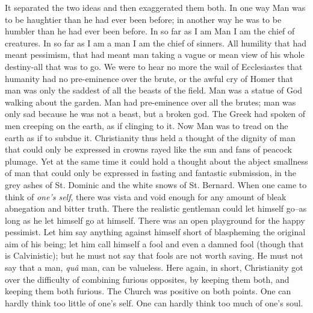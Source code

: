 \documentclass{book}
\begin{document}
It separated the two ideas and then exaggerated them both. In one way Man was to be haughtier than he had ever been before; in another way he was to be humbler than he had ever been before. In so far as I am Man I am the chief of creatures. In so far as I am a man I am the chief of sinners. All humility that had meant pessimism, that had meant man taking a vague or mean view of his whole destiny-all that was to go. We were to hear no more the wail of Ecclesiastes that humanity had no pre-eminence over the brute, or the awful cry of Homer that man was only the saddest of all the beasts of the field. Man was a statue of God walking about the garden. Man had pre-eminence over all the brutes; man was only sad because he was not a beast, but a broken god. The Greek had spoken of men creeping on the earth, as if clinging to it. Now Man was to tread on the earth as if to subdue it. Christianity thus held a thought of the dignity of man that could only be expressed in crowns rayed like the sun and fans of peacock plumage. Yet at the same time it could hold a thought about the abject smallness of man that could only be expressed in fasting and fantastic submission, in the grey ashes of St. Dominic and the white snows of St. Bernard. When one came to think of \emph{one’s self}, there was vista and void enough for any amount of bleak abnegation and bitter truth. There the realistic gentleman could let himself go–as long as he let himself go at himself. There was an open playground for the happy pessimist. Let him say anything against himself short of blaspheming the original aim of his being; let him call himself a fool and even a damned fool (though that is Calvinistic); but he must not say that fools are not worth saving. He must not say that a man, \emph{quâ} man, can be valueless. Here again, in short, Christianity got over the difficulty of combining furious opposites, by keeping them both, and keeping them both furious. The Church was positive on both points. One can hardly think too little of one’s self. One can hardly think too much of one’s soul.
\end{document}
